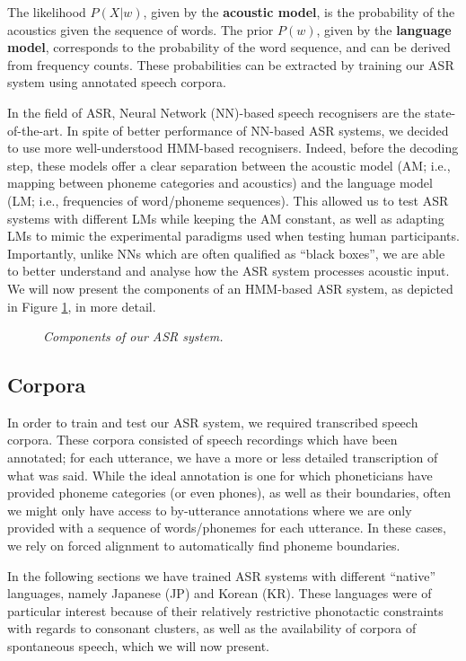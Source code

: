 The likelihood $P(X|w)$, given by the \textbf{acoustic model}, is the probability of the acoustics given the sequence of words. The prior $P(w)$, given by the \textbf{language model}, corresponds to the probability of the word sequence, and can be derived from frequency counts. These probabilities can be extracted by training our ASR system using annotated speech corpora.

In the field of ASR, Neural Network (NN)-based speech recognisers are the state-of-the-art. In spite of better performance of NN-based ASR systems, we decided to use more well-understood HMM-based recognisers. Indeed, before the decoding step, these models offer a clear separation between the acoustic model (AM; i.e., mapping between phoneme categories and acoustics) and the language model (LM; i.e., frequencies of word/phoneme sequences). This allowed us to test ASR systems with different LMs while keeping the AM constant, as well as adapting LMs to mimic the experimental paradigms used when testing human participants. Importantly, unlike NNs which are often qualified as ``black boxes'', we are able to better understand and analyse how the ASR system processes acoustic input. 
We will now present the components of an HMM-based ASR system, as depicted in Figure \ref{fig:hmm_architecture}, in more detail.

\begin{figure}[htb]
\centering
\caption{{\color{red}\textit{Components of our ASR system.}}}
\label{fig:hmm_architecture}
\end{figure}

\subsection{Corpora}

In order to train and test our ASR system, we required transcribed speech corpora. These corpora consisted of speech recordings which have been annotated; for each utterance, we have a more or less detailed transcription of what was said.
While the ideal annotation is one for which phoneticians have provided phoneme categories (or even phones), as well as their boundaries, often we might only have access to by-utterance annotations where we are only provided with a sequence of words/phonemes for each utterance. In these cases, we rely on forced alignment to automatically find phoneme boundaries.

In the following sections we have trained ASR systems with different ``native'' languages, namely Japanese (JP) and Korean (KR). These languages were of particular interest because of their relatively restrictive phonotactic constraints with regards to consonant clusters, as well as the availability of corpora of spontaneous speech, which we will now present. 

